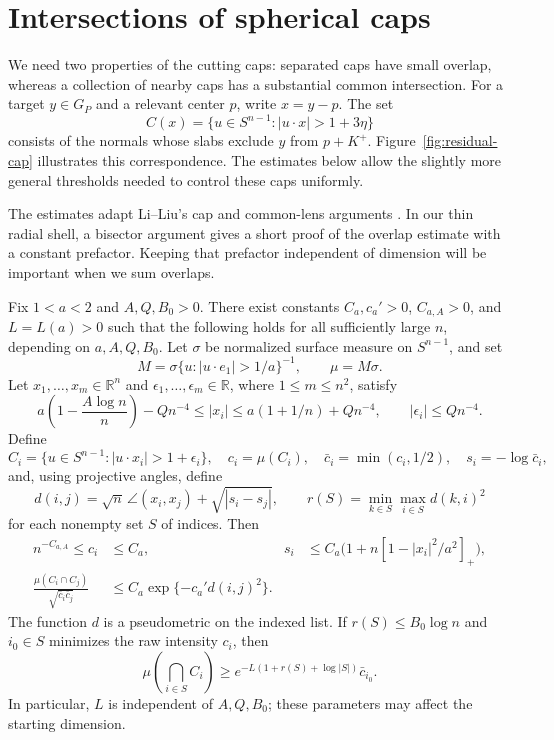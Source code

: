\section{Intersections of spherical caps}
\label{sec:caps}

We need two properties of the cutting caps: separated caps have small
overlap, whereas a collection of nearby caps has a substantial common
intersection. For a target $y\in G_P$ and a relevant center $p$, write
$x=y-p$. The set
\[
 C(x)=\{u\in S^{n-1}:|u\cdot x|>1+3\eta\}
\]
consists of the normals whose slabs exclude $y$ from $p+K^+$.
Figure~\ref{fig:residual-cap} illustrates this correspondence. The
estimates below allow the slightly more general thresholds needed to
control these caps uniformly.


The estimates adapt Li--Liu's cap and common-lens
arguments \cite[Lemma~6.1 and Lemmas~9.2--9.3]{LiLiu2026Lattice}.
In our thin radial shell, a bisector argument gives a short proof of the
overlap estimate with a constant prefactor. Keeping that prefactor
independent of dimension will be important when we sum overlaps.

\begin{lemma}\label{lem:caps}
Fix \(1<a<2\) and \(A,Q,B_0>0\). There exist constants
\(C_a,c_a'>0\), \(C_{a,A}>0\), and \(L=L(a)>0\) such that the
following holds for all sufficiently large \(n\), depending on
\(a,A,Q,B_0\). Let \(\sigma\) be normalized surface measure on
\(S^{n-1}\), and set
\[
 M=\sigma\{u:|u\cdot e_1|>1/a\}^{-1},\qquad \mu=M\sigma.
\]
Let \(x_1,\ldots,x_m\in\mathbb{R}^n\) and
\(\epsilon_1,\ldots,\epsilon_m\in\mathbb{R}\), where
\(1\le m\le n^2\), satisfy
\[
 a\left(1-\frac{A\log n}{n}\right)-Qn^{-4}
 \le |x_i|\le a(1+1/n)+Qn^{-4},\qquad
 |\epsilon_i|\le Qn^{-4}.
\]
Define
\[
 C_i=\{u\in S^{n-1}:|u\cdot x_i|>1+\epsilon_i\},\quad
 c_i=\mu(C_i),\quad \bar c_i=\min(c_i,1/2),\quad
 s_i=-\log\bar c_i,
\]
and, using projective angles, define
\[
 d(i,j)=\sqrt n\,\angle(x_i,x_j)+\sqrt{|s_i-s_j|},\qquad
 r(S)=\min_{k\in S}\max_{i\in S}d(k,i)^2
\]
for each nonempty set \(S\) of indices. Then
\begin{align}
 n^{-C_{a,A}}\le c_i&\le C_a,
 &s_i&\le C_a\bigl(1+n[1-|x_i|^2/a^2]_+\bigr),
 \label{eq:caps-cost}\\
 \frac{\mu(C_i\cap C_j)}{\sqrt{\bar c_i\bar c_j}}
 &\le C_a\exp\{-c_a'd(i,j)^2\}.
 \label{eq:caps-affinity}
\end{align}
The function \(d\) is a pseudometric on the indexed list. If
\(r(S)\le B_0\log n\) and \(i_0\in S\) minimizes the raw intensity
\(c_i\), then
\begin{equation}
 \mu\left(\bigcap_{i\in S}C_i\right)
 \ge e^{-L(1+r(S)+\log|S|)}\bar c_{i_0}.
 \label{eq:caps-lens}
\end{equation}
In particular, \(L\) is independent of \(A,Q,B_0\); these parameters
may affect the starting dimension.
\end{lemma}

